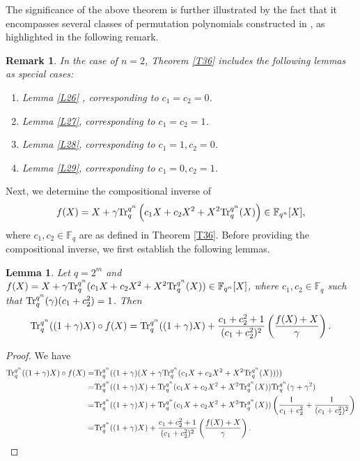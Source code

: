 \documentclass[11pt]{amsart}
\theoremstyle{plain}
\newtheorem{lem}[thm]{Lemma}
\newtheorem{rmk}[thm]{Remark}
\numberwithin{equation}{section}
\theoremstyle{definition}
\newcommand{\F}{\mathbb F}
\def\Tr{{\rm Tr}}
\begin{document}
   The significance of the above theorem is further illustrated by the fact that it encompasses several classes of permutation polynomials constructed in \cite{JYLQ}, as highlighted in the following remark.
\begin{rmk}
    In the case of $n=2$, Theorem \ref{T36} includes the following lemmas as special cases:
    \begin{enumerate}
        \item Lemma \ref{L26} \cite[Theorem 3.1]{JYLQ}, corresponding to $c_1=c_2=0$.
        \item Lemma \ref{L27}\cite[Theorem 3.3]{JYLQ}, corresponding to $c_1=c_2=1$.
        \item Lemma \ref{L28}\cite[Theorem 3.5]{JYLQ}, corresponding to $c_1=1, c_2=0$.
        \item Lemma \ref{L29}\cite[Theorem 3.6]{JYLQ}, corresponding to $c_1=0, c_2=1$.
    \end{enumerate}
\end{rmk}
Next, we determine the compositional inverse of
\[
f(X)=X+\gamma \Tr_{q}^{q^n}\left(c_1X+c_2X^2+X^2\Tr_{q}^{q^n}(X)\right)\in \mathbb{F}_{q^n}[X],
\]
where \(c_1,c_2\in\mathbb{F}_q\) are as defined in Theorem \ref{T36}. Before providing the compositional inverse, we first establish the following lemmas.

\begin{lem}\label{L41}
    Let $q=2^m$ and $f(X)=X+\gamma \Tr_{q}^{q^n}(c_1X+c_2X^2+X^2\Tr_{q}^{q^n}(X))\in \F_{q^n}[X]$, where $c_1, c_2 \in \F_q$ such that  $\Tr_{q}^{q^n}(\gamma)(c_1+c_2^2)=1$. Then $$\Tr_{q}^{q^n}((1+\gamma)X) \circ f(X)=\Tr_{q}^{q^n}((1+\gamma)X)+\frac{c_1+c_2^2+1}{(c_1+c_2^2)^2}\left(\frac{f(X)+X}{\gamma}\right).$$
\end{lem}
\begin{proof}
    We have 
    \begin{equation*}
    \begin{split}
        \Tr_{q}^{q^n}((1+\gamma)X) \circ f(X)=&\Tr_{q}^{q^n}((1+\gamma)(X+\gamma\Tr_{q}^{q^n}(c_1X+c_2X^2+X^2\Tr_{q}^{q^n}(X))))
        \\=& \Tr_{q}^{q^n}((1+\gamma)X)+\Tr_{q}^{q^n}(c_1X+c_2X^2+X^2\Tr_{q}^{q^n}(X))\Tr_{q}^{q^n}(\gamma+\gamma^2)
        \\=&\Tr_{q}^{q^n}((1+\gamma)X)+\Tr_{q}^{q^n}(c_1X+c_2X^2+X^2\Tr_{q}^{q^n}(X))\left(\frac{1}{c_1+c_2^2}+\frac{1}{(c_1+c_2^2)^2}\right)
        \\=&\Tr_{q}^{q^n}((1+\gamma)X)+\frac{c_1+c_2^2+1}{(c_1+c_2^2)^2}\left(\frac{f(X)+X}{\gamma}\right).
    \end{split}
         \end{equation*}
\end{proof}
\end{document}
